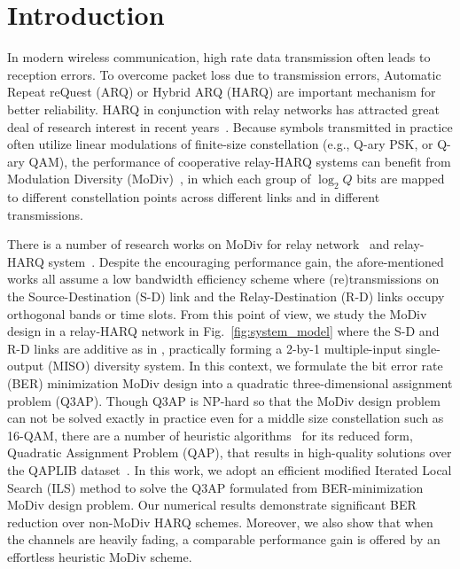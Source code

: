 \documentclass[journal,draftcls,onecolumn,12pt,twoside]{IEEEtran}
\begin{document}
\section{Introduction}
In modern wireless communication, high rate data transmission often leads
to reception errors. To overcome packet loss due to transmission errors, 
Automatic Repeat reQuest (ARQ) or Hybrid ARQ (HARQ) are important mechanism for
better reliability. HARQ in conjunction with relay networks has attracted great
deal of research interest in recent years~\cite{ngo2014hybrid}. Because symbols
transmitted in practice often utilize linear modulations of finite-size
constellation (e.g., Q-ary PSK, or Q-ary QAM), the performance of cooperative
relay-HARQ systems can benefit from Modulation Diversity 
(MoDiv)~\cite{benelli1992new}, in which each
group of $\log_2 Q$ bits are mapped to different constellation points across
different links and in different transmissions. 

There is a number of research works on MoDiv for relay
network~\cite{seddik2008trans, khormuji2008rate} and relay-HARQ
system~\cite{kim2009design, ryu2011ber}. Despite the encouraging
performance gain, the afore-mentioned works all assume a low bandwidth
efficiency scheme where (re)transmissions on the Source-Destination (S-D) link
and the Relay-Destination (R-D) links occupy orthogonal bands or time slots.
From this point of view, we study the MoDiv design in a relay-HARQ network in
Fig.~\ref{fig:system_model} where the S-D and R-D links are additive as in
\cite{cover1979capacity, nabar2004fading}, practically
forming a 2-by-1 multiple-input single-output (MISO) diversity system. In this
context, we formulate the bit error rate (BER) minimization MoDiv design into a
quadratic three-dimensional assignment problem (Q3AP). Though Q3AP is NP-hard so
that the MoDiv design problem can not be solved exactly in practice even for a
middle size constellation such as 16-QAM, there are a number of heuristic
algorithms~\cite{benlic2015memetic}
for its reduced form, Quadratic Assignment Problem (QAP), that results in
high-quality solutions over the QAPLIB dataset~\cite{burkard1997qaplib}. In this
work, we adopt an efficient modified Iterated Local Search (ILS) method to solve
the Q3AP formulated from BER-minimization MoDiv design problem. Our numerical
results demonstrate significant BER reduction over non-MoDiv HARQ schemes.
Moreover, we also show that when the channels are heavily fading, a comparable
performance gain is offered by an effortless heuristic MoDiv scheme.
\end{document}
